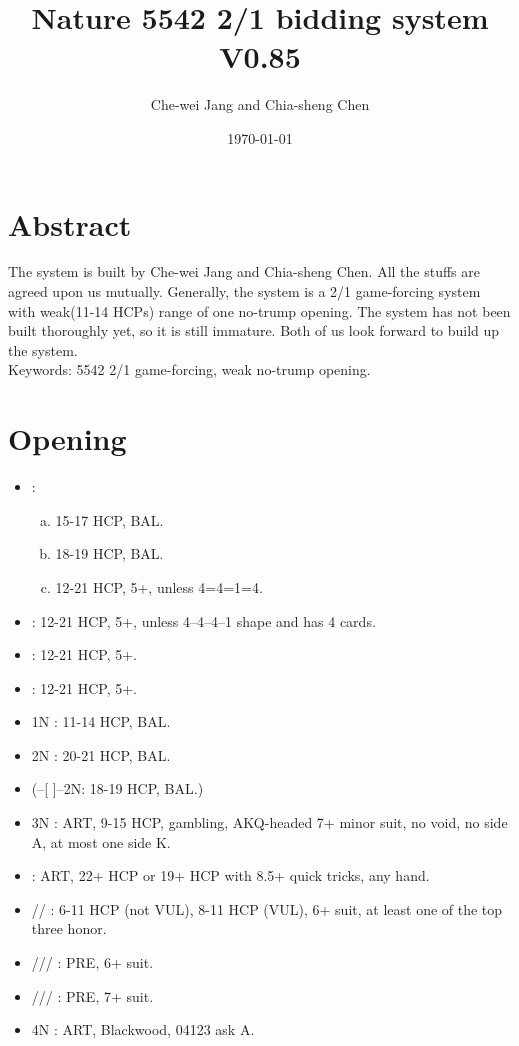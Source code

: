 \documentclass[12pt,twoside,a5paper]{report}%
\begin{document}
\title{Nature 5542 2/1 bidding system V0.85}
\author{Che-wei Jang and Chia-sheng Chen}
\date{\today}
\maketitle
\tableofcontents


\chapter*{Abstract}
	The system is built by Che-wei Jang and Chia-sheng Chen. All the stuffs are agreed upon us mutually. Generally, the system is a 2/1 game-forcing system with weak(11-14 HCPs) range of one no-trump opening.
	The system has not been built thoroughly yet, so it is still immature. Both of us look forward to build up the system.\\
	Keywords: 5542 2/1 game-forcing, weak no-trump opening.
\chapter*{Opening}
	\begin{itemize}
	\renewcommand{\labelitemi}{}
		\item {}: 
		\begin{enumerate}[(a)]
			\item 15-17 HCP, BAL.
			\item 18-19 HCP, BAL.
			\item 12-21 HCP, 5+\cl{}, unless 4=4=1=4.
		\end{enumerate}
		\item {} : 12-21 HCP, 5+\di{}, unless 4--4--4--1 shape and \di{} has 4 cards.
		\item {} : 12-21 HCP, 5+\he{}.
		\item {} : 12-21 HCP, 5+\sp{}.
		\item 1N : 11-14 HCP, BAL.
		\item 2N : 20-21 HCP, BAL.
		\item (--[ ]--2N: 18-19 HCP, BAL.)
		\item 3N : ART, 9-15 HCP, gambling, AKQ-headed 7+ minor suit, no void, no side A, at most one side K.
		\item {} : ART, 22+ HCP or 19+ HCP with 8.5+ quick tricks, any hand.
		\item {}/\he{}/\sp{} : 6-11 HCP (not VUL), 8-11 HCP (VUL), 6+ suit, at least one of the top three honor.
		\item {}/\di{}/\he{}/\sp{} : PRE, 6+ suit.
		\item {}/\di{}/\he{}/\sp{} : PRE, 7+ suit.
		\item 4N : ART, Blackwood, 04123 ask A.
	\end{itemize}
\end{document}
